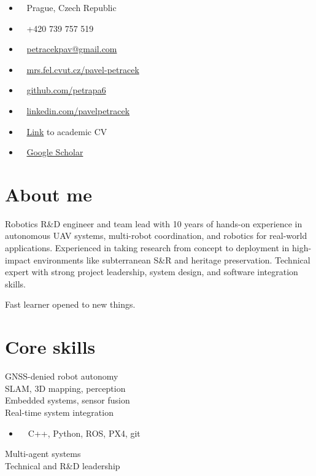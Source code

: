 \documentclass[12pt,a4paper]{article}
\newcommand\Colorhref[3][ref]{\href{#2}{\color{#1}#3}}
\begin{document}
\begin{paracol}{2}
\vspace{5mm}
\begin{itemize}
\item \faLocationArrow~ Prague, Czech Republic
\item \faPhone~ +420 739 757 519
\item \faEnvelope~ \Colorhref{mailto:petracekpav@gmail.com}{petracekpav@gmail.com}
\item \faHome~ \Colorhref{https://mrs.fel.cvut.cz/pavel-petracek}{mrs.fel.cvut.cz/pavel-petracek}
\item \faGithub~ \Colorhref{https://github.com/petrapa6}{github.com/petrapa6}
\item \faLinkedin~ \Colorhref{https://www.linkedin.com/in/pavelpetracek/}{linkedin.com/pavelpetracek}
\item \faStickyNote~ \Colorhref{https://raw.githubusercontent.com/petrapa6/cv/master/academic_cv.pdf}{Link} to academic CV
\item \faGoogle~ \Colorhref{https://scholar.google.com/citations?user=IwzN6MQAAAAJ}{Google Scholar}
\end{itemize}

\vspace{0.6em}
\section*{About me}
Robotics R\&D engineer and team lead with 10 years of hands-on experience in autonomous UAV systems, multi-robot coordination, and robotics for real-world applications.
Experienced in taking research from concept to deployment in high-impact environments like subterranean S\&R and heritage preservation.
Technical expert with strong project leadership, system design, and software integration skills.

\vspace{0.4em}
\noindent
Fast learner opened to new things.

\vspace{0.6em}
\section*{Core skills}
GNSS-denied robot autonomy\\
SLAM, 3D mapping, perception\\
Embedded systems, sensor fusion\\
Real-time system integration
\begin{itemize}
  \item ~~C++, Python, ROS, PX4, git
\end{itemize}
Multi-agent systems\\
Technical and R\&D leadership


\end{paracol}
\end{document}
